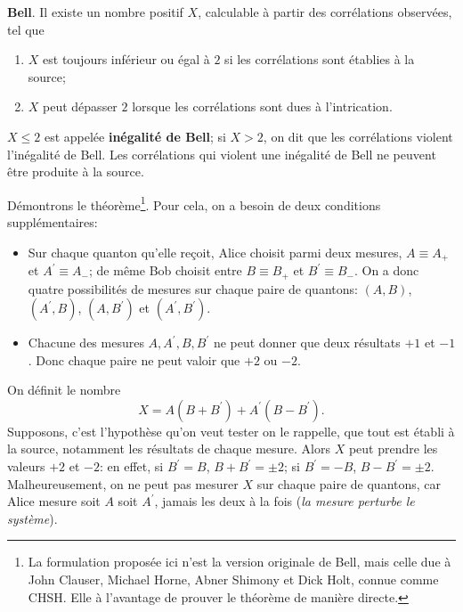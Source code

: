 \medskip\colorbox[gray]{0.8}{
\parbox[c]{0.9\textwidth}{
\begin{theorem}
\textbf{Bell}. Il existe un nombre positif $X$, calculable à partir des
corrélations observées, tel que

\begin{enumerate}
\item $X$ est toujours inférieur ou égal à $2$ si les corrélations sont établies
à la source;

\item $X$ peut dépasser $2$ lorsque les corrélations sont dues à l'intrication.
\end{enumerate}

$X\leq2$ est appelée \textbf{inégalité de Bell}; si $X>2$, on dit que les
corrélations violent l'inégalité de Bell. Les corrélations qui violent une
inégalité de Bell ne peuvent être produite à la source.
\end{theorem}
}}

Démontrons le théorème\footnote{La formulation proposée ici n'est la version
originale de Bell, mais celle due à John Clauser, Michael Horne, Abner Shimony
et Dick Holt, connue comme CHSH. Elle à l'avantage de prouver le théorème de
manière directe.}. Pour cela, on a besoin de deux conditions supplémentaires:
\begin{itemize}
\item Sur chaque quanton qu'elle reçoit, Alice choisit parmi deux mesures,
$A\equiv A_{+}$ et $A^{\prime}\equiv A_{-}$; de même Bob choisit entre $B\equiv
B_{+}$ et $B^{\prime}\equiv B_{-}$. On a donc quatre possibilités de mesures sur
chaque paire de quantons: $(A,B)$, $(A^{\prime},B)$, $(A,B^{\prime})$ et
$(A^{\prime},B^{\prime})$.

\item Chacune des mesures $A,A^{\prime},B,B^{\prime}$ ne peut donner que deux
résultats $+1$ et $-1$. Donc chaque paire ne peut valoir que $+2$ ou $-2$.
\end{itemize}

On définit le nombre%
\begin{equation}
X=A(B+B^{\prime})+A^{\prime}(B-B^{\prime}).
\end{equation}
Supposons, c'est l'hypothèse qu'on veut tester on le rappelle, que tout est
établi à la source, notamment les résultats de chaque mesure. Alors $X$ peut
prendre les valeurs $+2$ et $-2$: en effet, si $B^{\prime}=B$,
$B+B^{\prime}=\pm2$; si $B^{\prime}=-B$, $B-B^{\prime}=\pm2$. Malheureusement,
on ne peut pas mesurer $X$ sur chaque paire de quantons, car Alice mesure soit
$A$ soit $A^{\prime}$, jamais les deux à la fois (\emph{la mesure perturbe le
système}).

